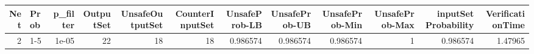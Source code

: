 \begin{tabular}{rlrrrrrrrrrr}
\hline
   Net & Prob   &   p\_filter &   OutputSet &   UnsafeOutputSet &   CounterInputSet &   UnsafeProb-LB &   UnsafeProb-UB &   UnsafeProb-Min &   UnsafeProb-Max &   inputSet Probability &   VerificationTime \\
\hline
     2 & 1-5    &      1e-05 &          22 &                18 &                18 &        0.986574 &        0.986574 &         0.986574 &                1 &               0.986574 &            1.47965 \\
\hline
\end{tabular}
